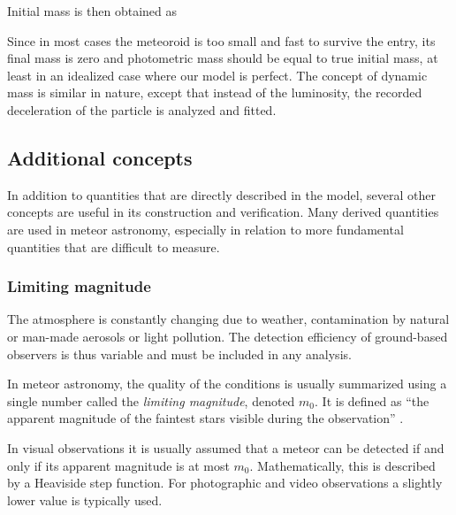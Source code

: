             Initial mass is then obtained as

            Since in most cases the meteoroid is too small and fast to survive the entry, its final mass is zero
            and photometric mass should be equal to true initial mass, at least in an idealized case where our model is perfect.
            The concept of dynamic mass is similar in nature, except that instead of the luminosity,
            the recorded deceleration of the particle is analyzed and fitted.

    \subsection{Additional concepts} \label{msa}
        In addition to quantities that are directly described in the model, several other concepts are useful
        in its construction and verification. Many derived quantities are used in meteor astronomy,
        especially in relation to more fundamental quantities that are difficult to measure.

        \subsubsection{Limiting magnitude} \label{msam}
            The atmosphere is constantly changing due to weather, contamination
            by natural or man-made aerosols or light pollution. The detection efficiency
            of ground-based observers is thus variable and must be included in any analysis.

            In meteor astronomy, the quality of the conditions is usually summarized
            using a single number called the \emph{limiting magnitude}, denoted $m_0$.
            It is defined as ``the apparent magnitude of the faintest stars visible during the observation'' \citep{imo-glossary}.

            In visual observations it is usually assumed that a meteor can be detected if and only if
            its apparent magnitude is at most $m_0$. Mathematically, this is described by a Heaviside step function.
            For photographic and video observations a slightly lower value is typically used.

